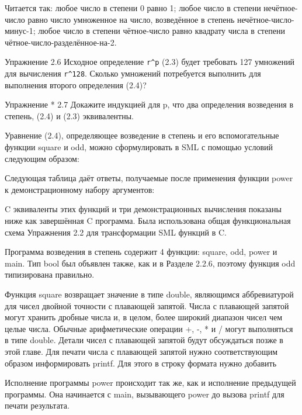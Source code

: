 Читается так: любое число в степени 0 равно 1; любое число в степени нечётное-число равно число умноженное на число, возведённое в степень нечётное-число-минус-1; любое число в степени чётное-число равно квадрату числа в степени чётное-число-разделённое-на-2.

Упражнение 2.6 Исходное определение \lstinline|r^p| (2.3) будет требовать 127 умножений для вычисления \lstinline|r^128|. Сколько умножений потребуется выполнить для выполнения второго определения (2.4)?

Упражнение * 2.7 Докажите индукцией для p, что два определения возведения в степень, (2.4) и (2.3) эквивалентны.

Уравнение (2.4), определяющее возведение в степень и его вспомогательные функции square и odd, можно сформулировать в SML с помощью условий следующим образом:

Следующая таблица даёт ответы, получаемые после применения функции power к демонстрационному набору аргументов:

C эквиваленты этих функций и три демонстрационных вычисления показаны ниже как завершённая C программа. Была использована общая функциональная схема Упражнения 2.2 для трансформации SML функций в C.

Программа возведения в степень содержит 4 функции: square, odd, power и main. Тип bool был объявлен также, как и в Разделе 2.2.6, поэтому функция odd типизирована правильно.

Функция square возвращает значение в типе double, являющимся аббревиатурой для чисел двойной точности с плавающей запятой. Числа с плавающей запятой могут хранить дробные числа и, в целом, более широкий диапазон чисел чем целые числа. Обычные арифметические операции +, -, * и / могут выполняться в типе double. Детали чисел с плавающей запятой будут обсуждаться позже в этой главе. Для печати числа с плавающей запятой нужно соответствующим образом информировать printf. Для этого в строку формата нужно добавить %

Исполнение программы power происходит так же, как и исполнение предыдущей программы. Она начинается с main, вызывающего power до вызова printf для печати результата.

